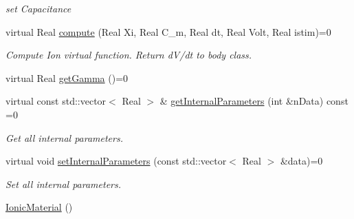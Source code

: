 \begin{DoxyCompactItemize}
\begin{DoxyCompactList}\small\item\em set Capacitance \item\end{DoxyCompactList}\item 
\hypertarget{classvoom_1_1_ionic_material_a1b95cf90af115374b428f2e5ece571cb}{
virtual Real \hyperlink{classvoom_1_1_ionic_material_a1b95cf90af115374b428f2e5ece571cb}{compute} (Real Xi, Real C\_\-m, Real dt, Real Volt, Real istim)=0}
\label{classvoom_1_1_ionic_material_a1b95cf90af115374b428f2e5ece571cb}

\begin{DoxyCompactList}\small\item\em Compute Ion virtual function. Return dV/dt to body class. \item\end{DoxyCompactList}\item 
virtual Real \hyperlink{classvoom_1_1_ionic_material_a98f1fa5bc5fa9ff6abfcd302111f8eac}{getGamma} ()=0
\item 
\hypertarget{classvoom_1_1_ionic_material_adb8811b4155603d5704199f49930c65d}{
virtual const std::vector$<$ Real $>$ \& \hyperlink{classvoom_1_1_ionic_material_adb8811b4155603d5704199f49930c65d}{getInternalParameters} (int \&nData) const =0}
\label{classvoom_1_1_ionic_material_adb8811b4155603d5704199f49930c65d}

\begin{DoxyCompactList}\small\item\em Get all internal parameters. \item\end{DoxyCompactList}\item 
\hypertarget{classvoom_1_1_ionic_material_a33436ae3d6125810d5dbe04d72c461aa}{
virtual void \hyperlink{classvoom_1_1_ionic_material_a33436ae3d6125810d5dbe04d72c461aa}{setInternalParameters} (const std::vector$<$ Real $>$ \&data)=0}
\label{classvoom_1_1_ionic_material_a33436ae3d6125810d5dbe04d72c461aa}

\begin{DoxyCompactList}\small\item\em Set all internal parameters. \item\end{DoxyCompactList}\item 
\hypertarget{classvoom_1_1_ionic_material_a00d1b9c076c6fb51ef7418251eec5388}{
\hyperlink{classvoom_1_1_ionic_material_a00d1b9c076c6fb51ef7418251eec5388}{IonicMaterial} ()}
\label{classvoom_1_1_ionic_material_a00d1b9c076c6fb51ef7418251eec5388}


\end{DoxyCompactItemize}
